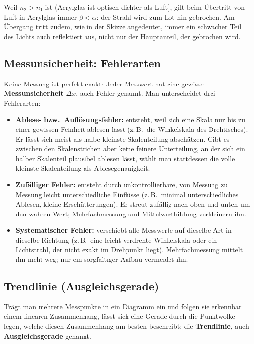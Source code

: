 \documentclass[11pt,a4paper]{article}
\begin{document}
\begin{tippbox}
Weil $n_2 > n_1$ ist (Acrylglas ist optisch dichter als Luft), gilt beim Übertritt von Luft in Acrylglas immer $\beta < \alpha$: der Strahl wird zum Lot hin gebrochen. Am Übergang tritt zudem, wie in der Skizze angedeutet, immer ein schwacher Teil des Lichts auch reflektiert aus, nicht nur der Hauptanteil, der gebrochen wird.
\end{tippbox}

\subsection{Messunsicherheit: Fehlerarten}
\label{sec:fehlerarten}
Keine Messung ist perfekt exakt: Jeder Messwert hat eine gewisse \textbf{Messunsicherheit} $\Delta x$, auch Fehler genannt. Man unterscheidet drei Fehlerarten:
\begin{itemize}
  \item \textbf{Ablese- bzw.\ Auflösungsfehler:} entsteht, weil sich eine Skala nur bis zu einer gewissen Feinheit ablesen lässt (z.\,B.\ die Winkelskala des Drehtisches). Er lässt sich meist als halbe kleinste Skalenteilung abschätzen. Gibt es zwischen den Skalenstrichen aber keine feinere Unterteilung, an der sich ein halber Skalenteil plausibel ablesen lässt, wählt man stattdessen die volle kleinste Skalenteilung als Ablesegenauigkeit.
  \item \textbf{Zufälliger Fehler:} entsteht durch unkontrollierbare, von Messung zu Messung leicht unterschiedliche Einflüsse (z.\,B.\ minimal unterschiedliches Ablesen, kleine Erschütterungen). Er streut zufällig nach oben und unten um den wahren Wert; Mehrfachmessung und Mittelwertbildung verkleinern ihn.
  \item \textbf{Systematischer Fehler:} verschiebt alle Messwerte auf dieselbe Art in dieselbe Richtung (z.\,B.\ eine leicht verdrehte Winkelskala oder ein Lichtstrahl, der nicht exakt im Drehpunkt liegt). Mehrfachmessung mittelt ihn nicht weg; nur ein sorgfältiger Aufbau vermeidet ihn.
\end{itemize}

\subsection{Trendlinie (Ausgleichsgerade)}
\label{sec:trendlinie}
Trägt man mehrere Messpunkte in ein Diagramm ein und folgen sie erkennbar einem linearen Zusammenhang, lässt sich eine Gerade durch die Punktwolke legen, welche diesen Zusammenhang am besten beschreibt: die \textbf{Trendlinie}, auch \textbf{Ausgleichsgerade} genannt.
\end{document}

